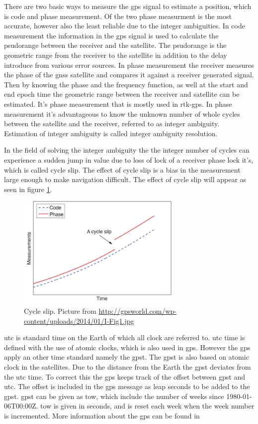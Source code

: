 There are two basic ways to measure the \gls{gps} signal to estimate a position, which is code and phase measurement. Of the two phase measurment is the most accurate, however also the least reliable due to the integer ambiguities. In code measurement the information in the \gls{gps} signal is used to calculate the psudorange between the receiver and the satellite. The psudorange is the geometric range from the receiver to the satellite in addition to the delay introduce from various error sources. In phase measurement the receiver measures the phase of the \gls{gnss} satellite and compares it against a receiver generated signal. Then by knowing the phase and the frequency function, as well at the start and end epoch time the geometric range between the receiver and satellite can be estimated. It's phase measurement that is mostly used in \gls{rtk-gps}. In phase measurement it's advantageous to know the unknown number of whole cycles between the satellite and the receiver, referred to as integer ambiguity. Estimation of integer ambiguity is called integer ambiguity resolution.

In the field of solving the integer ambiguity the the integer number of cycles can experience a sudden jump in value due to loss of lock of a receiver phase lock it's, which is called cycle slip. The effect of cycle slip is a bias in the measurement large enough to make navigation difficult. The effect of cycle slip will appear as seen in figure \ref{figure:CycleSlip}.
\begin{figure}[H]
	\centering
		\includegraphics[width=0.7\textwidth]{figs/cycleSlip.jpg}
		\caption{Cycle slip. Picture from \url{http://gpsworld.com/wp-content/uploads/2014/01/I-Fig1.jpg}}
		\label{figure:CycleSlip}
\end{figure}

\gls{utc} is standard time on the Earth of which all clock are referred to. \gls{utc} time is defined with the use of atomic clocks, which is also used in \gls{gps}. However the \gls{gps} apply an other time standard namely the \gls{gpst}. The \gls{gpst} is also based on atomic clock in the satellites. Due to the distance from the Earth the \gls{gpst} deviates from the \gls{utc} time. To correct this the \gls{gps} keeps track of the offset between \gls{gpst} and \gls{utc}. The offset is included in the \gls{gps} message as leap seconds to be added to the \gls{gpst}. \gls{gpst} can be given as \gls{tow}, which include the number of weeks since 1980-01-06T00:00Z. \gls{tow} is given in seconds, and is reset each week when the week number is incremented. More information about the \gls{gps} can be found in \citep{GPSBOOK,vik2014integrated} 

